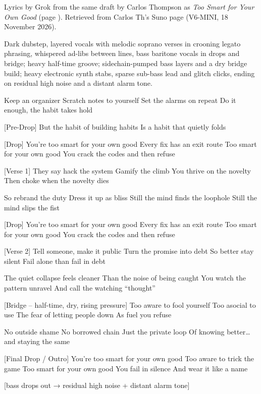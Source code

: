 \label{sec:too-smart-for-your-own-good-dubstep}
\begin{notes}
Lyrics by Grok from the same draft by Carlos Thompson as \emph{Too Smart for Your Own Good} (page \pageref{sec:too-smart-for-your-own-good}). Retrieved from Carlos Th's Suno page (V6-MINI, 18 November 2026).
\end{notes}
\begin{style}
Dark dubstep, layered vocals with melodic soprano verses in crooning legato phrasing, whispered ad-libs between lines, bass baritone vocals in drops and bridge; heavy half-time groove; sidechain-pumped bass layers and a dry bridge build; heavy electronic synth stabs, sparse sub-bass lead and glitch clicks, ending on residual high noise and a distant alarm tone.
\end{style}
\begin{lyrics}
Keep an organizer
Scratch notes to yourself
Set the alarms on repeat
Do it enough, the habit takes hold

[Pre-Drop]
But the habit of building habits
Is a habit that quietly folds

[Drop]
You’re too smart for your own good
Every fix has an exit route
Too smart for your own good
You crack the codes and then refuse

[Verse 1]
They say hack the system
Gamify the climb
You thrive on the novelty
Then choke when the novelty dies

So rebrand the duty
Dress it up as bliss
Still the mind finds the loophole
Still the mind slips the fist

[Drop]
You’re too smart for your own good
Every fix has an exit route
Too smart for your own good
You crack the codes and then refuse

[Verse 2]
Tell someone, make it public
Turn the promise into debt
So better stay silent
Fail alone than fail in debt

The quiet collapse feels cleaner
Than the noise of being caught
You watch the pattern unravel
And call the watching “thought”

[Bridge – half-time, dry, rising pressure]
Too aware to fool yourself
Too asocial to use
The fear of letting people down
As fuel you refuse

No outside shame
No borrowed chain
Just the private loop
Of knowing better… and staying the same

[Final Drop / Outro]
You’re too smart for your own good
Too aware to trick the game
Too smart for your own good
You fail in silence
And wear it like a name

[bass drops out → residual high noise + distant alarm tone]
\end{lyrics}

